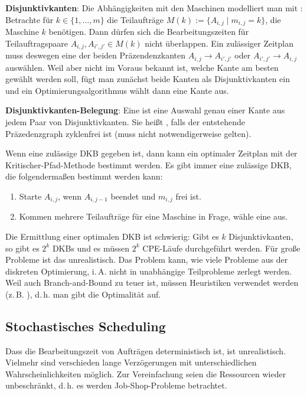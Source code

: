 \textbf{Disjunktivkanten}:
Die Abhängigkeiten mit den Maschinen modelliert man mit :
Betrachte für $k \in \{1, \dotsc, m\}$ die Teilaufträge $M(k) := \{A_{i,j} \;|\; m_{i,j} = k\}$,
die Maschine $k$ benötigen.
Dann dürfen sich die Bearbeitungszeiten für Teilauftragspaare $A_{i,j}, A_{i',j'} \in M(k)$
nicht überlappen.
Ein zulässiger Zeitplan muss deswegen eine der beiden Präzendenzkanten $A_{i,j} \to A_{i',j'}$ oder
$A_{i',j'} \to A_{i,j}$ auswählen.
Weil aber nicht im Voraus bekannt ist, welche Kante am besten gewählt werden soll,
fügt man zunächst beide Kanten als Disjunktivkanten ein und
ein Optimierungsalgorithmus wählt dann eine Kante aus.

\textbf{Disjunktivkanten-Belegung}:
Eine  ist eine Auswahl genau einer Kante aus jedem Paar
von Disjunktivkanten.
Sie heißt , falls der entstehende Präzedenzgraph zyklenfrei ist
(muss nicht notwendigerweise gelten).

Wenn eine zulässige DKB gegeben ist, dann kann ein optimaler Zeitplan
mit der Kritischer-Pfad-Methode bestimmt werden.
Es gibt immer eine zulässige DKB, die folgendermaßen bestimmt werden kann:
\begin{enumerate}
    \item
    Starte $A_{i,j}$, wenn $A_{i,j-1}$ beendet und $m_{i,j}$ frei ist.

    \item
    Kommen mehrere Teilaufträge für eine Maschine in Frage, wähle eine aus.
\end{enumerate}

Die Ermittlung einer optimalen DKB ist schwierig:
Gibt es $k$ Disjunktivkanten, so gibt es $2^k$ DKBs und es müssen $2^k$ CPE-Läufe durchgeführt
werden.
Für große Probleme ist das unrealistisch.
Das Problem kann, wie viele Probleme aus der diskreten Optimierung, i.\,A. nicht in unabhängige
Teilprobleme zerlegt werden.
Weil auch Branch-and-Bound zu teuer ist, müssen Heuristiken verwendet werden
(z.\,B. ), d.\,h. man gibt die Optimalität auf.

\pagebreak

\subsection{%
    Stochastisches Scheduling%
}

Dass die Bearbeitungszeit von Aufträgen deterministisch ist, ist unrealistisch.
Vielmehr sind verschieden lange Verzögerungen mit unterschiedlichen Wahrscheinlichkeiten möglich.
Zur Vereinfachung seien die Ressourcen wieder unbeschränkt,
d.\,h. es werden Job-Shop-Probleme betrachtet.

